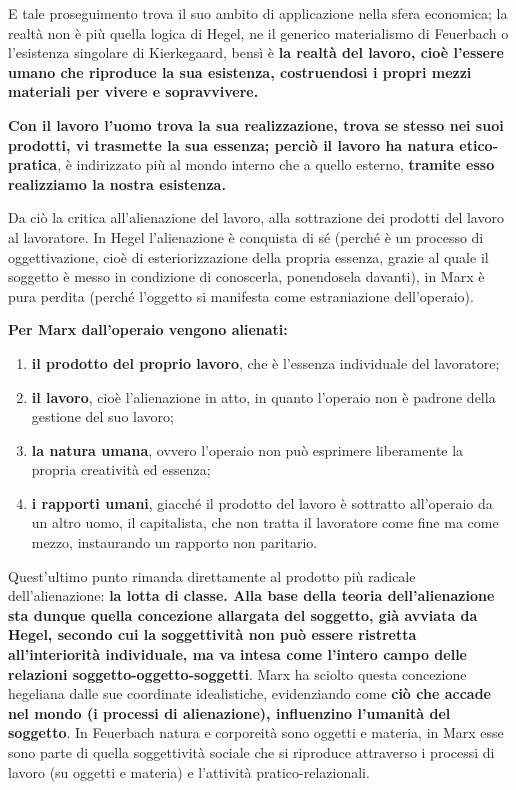  E tale proseguimento trova il suo ambito di applicazione nella sfera economica; la realtà non è più quella logica di Hegel, ne il generico materialismo di Feuerbach o l'esistenza singolare di Kierkegaard, bensì è \textbf{la realtà del lavoro, cioè l'essere umano che riproduce la sua esistenza, costruendosi i propri mezzi materiali per vivere e sopravvivere.}
 
 \textbf{Con il lavoro l'uomo trova la sua realizzazione, trova se stesso nei suoi prodotti, vi trasmette la sua essenza; perciò il lavoro ha natura etico-pratica}, è indirizzato più al mondo interno che a quello esterno, \textbf{tramite esso realizziamo la nostra esistenza.}
 
 Da ciò la critica all'alienazione del lavoro, alla sottrazione dei prodotti del lavoro al lavoratore. In Hegel l'alienazione è conquista di sé (perché è un processo di oggettivazione, cioè di esteriorizzazione della propria essenza, grazie al quale il soggetto è messo in condizione di conoscerla, ponendosela davanti), in Marx è pura perdita (perché l'oggetto si manifesta come estraniazione dell'operaio).
 
 \textbf{Per Marx dall'operaio vengono alienati:}
 
 \begin{enumerate}
 	\item \textbf{il prodotto del proprio lavoro}, che è l'essenza individuale del lavoratore;
 	\item \textbf{il lavoro}, cioè l'alienazione in atto, in quanto l'operaio non è padrone della gestione del suo lavoro;
 	\item \textbf{la natura umana}, ovvero l'operaio non può esprimere liberamente la propria creatività ed essenza;
 	\item \textbf{i rapporti umani}, giacché il prodotto del lavoro è sottratto all'operaio da un altro uomo, il capitalista, che non tratta il lavoratore come fine ma come mezzo, instaurando un rapporto non paritario.
 \end{enumerate}

Quest'ultimo punto rimanda direttamente al prodotto più radicale dell'alienazione: \textbf{la lotta di classe. Alla base della teoria dell'alienazione sta dunque quella concezione allargata del soggetto, già avviata da Hegel, secondo cui la soggettività non può essere ristretta all'interiorità individuale, ma va intesa come l'intero campo delle relazioni soggetto-oggetto-soggetti}. Marx ha sciolto questa concezione hegeliana dalle sue coordinate idealistiche, evidenziando come \textbf{ciò che accade nel mondo (i processi di alienazione), influenzino l'umanità del soggetto}. In Feuerbach natura e corporeità sono oggetti e materia, in Marx esse sono parte di quella soggettività sociale che si riproduce attraverso i processi di lavoro (su oggetti e materia) e l'attività pratico-relazionali.

